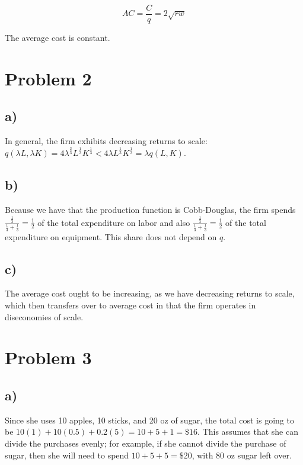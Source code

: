 \documentclass[12pt,letterpaper]{article}
\theoremstyle{definition}
\begin{document}
\[
  AC = \frac{C}{q} = 2\sqrt{rw}
\]

The average cost is constant.

\section*{Problem 2}

\subsection*{a)}


In general, the firm exhibits decreasing returns to scale: $q(\lambda L, \lambda
K) = 4\lambda^{\frac{2}{3}}L^{\frac{1}{3}}K^{\frac{1}{3}} < 4\lambda
L^{\frac{1}{3}}K^{\frac{1}{3}} = \lambda q(L,K)$.

\subsection*{b)}

Because we have that the production function is Cobb-Douglas, the firm spends
$\frac{\frac{1}{3}}{\frac{1}{3} + \frac{1}{3}} = \frac{1}{2}$ of the total
expenditure on labor and also $\frac{\frac{1}{3}}{\frac{1}{3} + \frac{1}{3}} =
\frac{1}{2}$ of the total expenditure on equipment. This share does not depend
on $q$.

\subsection*{c)}

The average cost ought to be increasing, as we have decreasing returns to scale,
which then transfers over to average cost in that the firm operates in
diseconomies of scale.

\section*{Problem 3}

\subsection*{a)}

Since she uses 10 apples, 10 sticks, and 20 oz of sugar, the total cost is going
to be $10(1) + 10(0.5) + 0.2(5) = 10 + 5 + 1 = \$16$. This assumes that she can
divide the purchases evenly; for example, if she cannot divide the purchase of
sugar, then she will need to spend $10 + 5 + 5 = \$20$, with 80 oz sugar left over.
\end{document}
